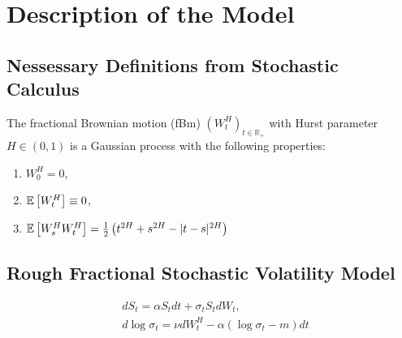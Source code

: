\section{Description of the Model}
    \subsection{Nessessary Definitions from Stochastic Calculus}
        \begin{definition}
            The fractional Brownian motion (fBm)  $(W_t^H)_{t\in \mathbb{R_+}}$ with Hurst 
            parameter $H \in (0, 1)$ is a Gaussian process with the following properties:
            \begin{enumerate}
                \item $W_0^H = 0$,
                \item $\mathbb{E}\left[W_t^H\right] \equiv 0$,
                \item $\mathbb{E}\left[W_s^H W_t^H\right] = \frac{1}{2} \left(t^{2H} + s^{2H} - |t-s|^{2H}\right)$
            \end{enumerate}
        \end{definition}



    \subsection{Rough Fractional Stochastic Volatility Model}
        
        \begin{align} \label{model:RFSV}
            &dS_t = \alpha S_tdt + \sigma_t S_tdW_t, \\
            &d\log\sigma_t = \nu dW_t^H - \alpha (\log\sigma_t-m)dt
        \end{align}
